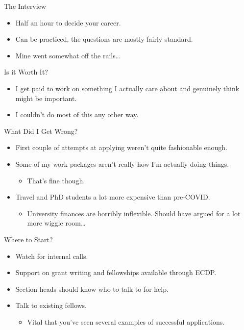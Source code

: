 \documentclass[aspectratio=169,compress,10pt]{beamer}
\begin{document}
\begin{frame}{The Interview}
    \begin{itemize}
        \item Half an hour to decide your career.
        \item Can be practiced, the questions are mostly fairly standard.
        \item Mine went somewhat off the rails\ldots
    \end{itemize}
\end{frame}

\begin{frame}{Is it Worth It?}
    \begin{itemize}
        \item I get paid to work on something I actually care about and genuinely think
            might be important.
        \item I couldn't do most of this any other way.
    \end{itemize}
\end{frame}

\begin{frame}{What Did I Get Wrong?}
    \begin{itemize}
        \item First couple of attempts at applying weren't quite fashionable enough.
        \item Some of my work packages aren't really how I'm actually doing things.
            \begin{itemize}
                \item That's fine though.
            \end{itemize}
        \item Travel and PhD students a lot more expensive than pre-COVID.
            \begin{itemize}
                \item University finances are horribly inflexible. Should have argued for
                    a lot more wiggle room\ldots
            \end{itemize}
    \end{itemize}
\end{frame}

\begin{frame}{Where to Start?}
    \begin{itemize}
        \item Watch for internal calls.
        \item Support on grant writing and fellowships available through ECDP.
        \item Section heads should know who to talk to for help.
        \item Talk to existing fellows.
            \begin{itemize}
                \item Vital that you've seen several examples of successful applications.
            \end{itemize}
    \end{itemize}
\end{frame}
\end{document}
